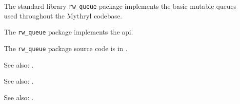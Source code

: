 
The standard library {\tt rw\_queue} package implements the basic mutable queues used 
throughout the Mythryl codebase.

The {\tt rw\_queue} package implements the  api.

The {\tt rw\_queue} package source code is in .

See also: .

See also: .

See also: .
